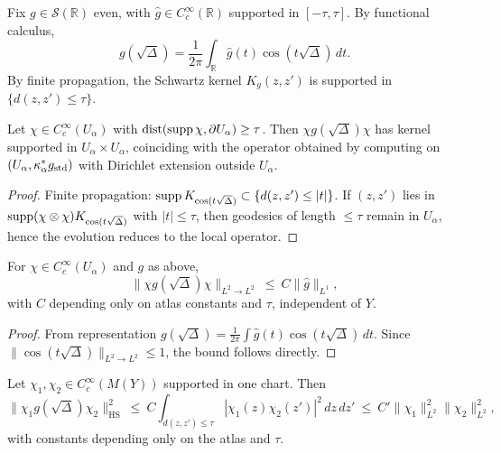 Fix $g\in\mathcal S(\mathbb R)$ even, with $\widehat g\in C_c^\infty(\mathbb R)$ supported
in $[-\tau,\tau]$. By functional calculus,
\[
g(\sqrt\Delta)=\frac1{2\pi}\int_{\mathbb R}\widehat g(t)\cos(t\sqrt\Delta)\,dt.
\]
By finite propagation, the Schwartz kernel $K_g(z,z')$ is supported in $\{d(z,z')\le\tau\}$.

\begin{lemma}
\label{lem:B-localcut}
Let $\chi\in C_c^\infty(U_\alpha)$ with $\operatorname{dist}(\operatorname{supp}\chi,\partial U_\alpha)\ge\tau$.
Then $\chi g(\sqrt\Delta)\chi$ has kernel supported in $U_\alpha\times U_\alpha$,
coinciding with the operator obtained by computing on $(U_\alpha,\kappa_\alpha^*g_{\rm std})$
with Dirichlet extension outside $U_\alpha$.
\end{lemma}

\begin{proof}
Finite propagation: $\operatorname{supp} K_{\cos(t\sqrt\Delta)}\subset\{d(z,z')\le|t|\}$.
If $(z,z')$ lies in $\operatorname{supp}(\chi\otimes\chi)K_{\cos(t\sqrt\Delta)}$ with $|t|\le\tau$,
then geodesics of length $\le\tau$ remain in $U_\alpha$, hence the evolution reduces
to the local operator.
\end{proof}

\begin{proposition}
\label{prop:B-L2bound}
For $\chi\in C_c^\infty(U_\alpha)$ and $g$ as above,
\[
\|\chi g(\sqrt\Delta)\chi\|_{L^2\to L^2}\ \le\ C\|\widehat g\|_{L^1},
\]
with $C$ depending only on atlas constants and $\tau$, independent of $Y$.
\end{proposition}

\begin{proof}
From representation $g(\sqrt\Delta)=\frac1{2\pi}\int\widehat g(t)\cos(t\sqrt\Delta)\,dt$.
Since $\|\cos(t\sqrt\Delta)\|_{L^2\to L^2}\le1$, the bound follows directly.
\end{proof}

\begin{lemma}
\label{lem:B-HS}
Let $\chi_1,\chi_2\in C_c^\infty(M(Y))$ supported in one chart. Then
\[
\|\chi_1 g(\sqrt\Delta)\chi_2\|_{\mathrm{HS}}^2
\ \le\ C\int_{d(z,z')\le\tau}|\chi_1(z)\chi_2(z')|^2\,dz\,dz'
\ \le\ C'\|\chi_1\|_{L^2}^2\|\chi_2\|_{L^2}^2,
\]
with constants depending only on the atlas and $\tau$.
\end{lemma}


